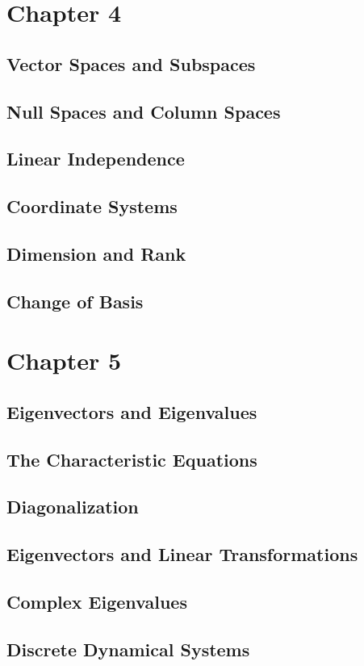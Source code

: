 \documentclass{article}
\begin{document}
\section{Chapter 4}
\subsection{Vector Spaces and Subspaces}
\subsection{Null Spaces and Column Spaces}
\subsection{Linear Independence}
\subsection{Coordinate Systems}
\subsection{Dimension and Rank}
\subsection{Change of Basis}
\section{Chapter 5}
\subsection{Eigenvectors and Eigenvalues}
\subsection{The Characteristic Equations}
\subsection{Diagonalization}
\subsection{Eigenvectors and Linear Transformations}
\subsection{Complex Eigenvalues}
\subsection{Discrete Dynamical Systems}
\end{document}
